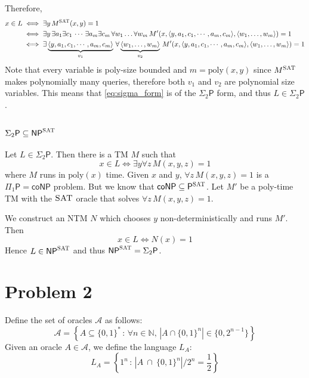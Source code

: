\documentclass{article}
\renewcommand{\P}[0]{\mathsf{P}}
\newcommand{\NP}[0]{\mathsf{NP}}
\newcommand{\SAT}[0]{\textsc{SAT}}
\begin{document}
Therefore,
\begin{align}
	x \in L & \iff \exists y \, M^\SAT(x, y) = 1 \nonumber                                                                                                                                                                                                                    \\
	        & \iff \exists y \, \exists a_1 \exists c_1 \, \cdots \, \exists a_m \exists c_m \, \forall w_1 \ldots \forall w_m\, M'(x, \langle y, a_1, c_1, \cdots, a_m, c_m \rangle, \langle w_1, \ldots, w_m \rangle) = 1 \nonumber                                         \\
	        & \iff \exists \underbrace{\langle y, a_1, c_1, \cdots, a_m, c_m\rangle}_{v_1} \, \forall \underbrace{\langle w_1, \ldots, w_m \rangle}_{v_2} \, M'(x, \langle y, a_1, c_1, \cdots, a_m, c_m \rangle, \langle w_1, \ldots, w_m \rangle) = 1 \label{eq:sigma_form}
\end{align}
Note that every variable is poly-size bounded and $m = \mathrm{poly}(x, y)$ since $M^{\SAT}$ makes polynomially many queries, therefore both $v_1$ and $v_2$ are polynomial size variables. This means that \autoref{eq:sigma_form} is of the $\Sigma_2\P$ form, and thus $L \in \Sigma_2\P$.


\subsection{$\Sigma_2\P \subseteq \NP^\SAT$}

Let $L \in \Sigma_2\P$. Then there is a TM $M$ such that
\[
	x \in L \iff \exists y \forall z \, M(x, y, z) = 1
\]
where $M$ runs in $\mathrm{poly}(x)$ time. Given $x$ and $y$, $\forall z \, M(x, y, z) = 1$ is a $\Pi_1\mathsf P = \mathsf{coNP}$ problem. But we know that $\mathsf{coNP} \subseteq \P^{\SAT}$. Let $M'$ be a poly-time TM with the $\SAT$ oracle that solves $\forall z \, M(x, y, z) = 1$.

We construct an NTM $N$ which chooses $y$ non-deterministically and runs $M'$. Then
\[
	x \in L \iff N(x) = 1
\]
Hence $L \in \NP^\SAT$ and thus $\NP^\SAT = \Sigma_2\P$.

\section*{Problem 2}

Define the set of oracles $\mathcal{A}$ as follows:
\[
	\mathcal{A} = \left\{ A \subseteq \{0, 1\}^*\,:\, \forall n \in \mathbb{N}, \, |A \cap \{0, 1\}^n| \in \{0, 2^{n-1}\} \right\}
\]
Given an oracle $A \in \mathcal{A}$, we define the language $L_A$:
\[
	L_A = \left\{ 1^n\,:\, |A \ \cap \ \{0,1\}^n|/2^n = \frac{1}{2} \right\}
\]
\end{document}
